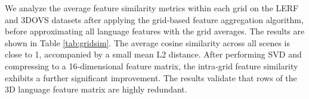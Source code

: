 \documentclass{article}
\begin{document}
We analyze the average feature similarity metrics within each grid on the LERF\cite{lerf2023} and 3DOVS\cite{liu2023weakly} datasets after applying the grid‑based feature aggregation algorithm, before approximating all language features with the grid averages. The results are shown in Table \ref{tab:gridsim}. The average cosine similarity across all scenes is close to 1, accompanied by a small mean L2 distance. After performing SVD and compressing to a 16‑dimensional feature matrix, the intra‑grid feature similarity exhibits a further significant improvement. The results validate that rows of the 3D language feature matrix are highly redundant.
\end{document}
